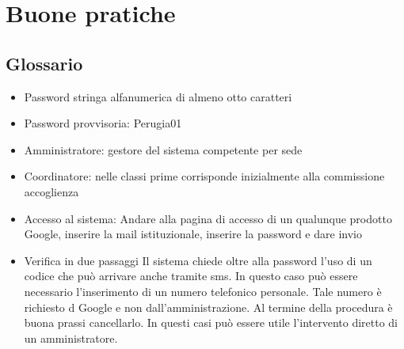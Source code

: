 \chapter{Buone pratiche}
\section{Glossario}
\begin{itemize}
	\item Password stringa alfanumerica di almeno otto caratteri
	\item Password provvisoria: Perugia01
	\item Amministratore: gestore del sistema competente per sede
	\item Coordinatore: nelle classi prime corrisponde inizialmente alla commissione 
	accoglienza
	\item Accesso al sistema: Andare alla pagina di accesso di un qualunque 
	prodotto Google, inserire la mail istituzionale, inserire la password e 
	dare invio
	\item Verifica in due passaggi Il sistema chiede oltre alla password l'uso 
	di un codice che può arrivare anche tramite sms. In questo caso può essere necessario
	l'inserimento di un numero telefonico personale. Tale numero è richiesto d Google e 
	non dall'amministrazione. Al termine della procedura è buona prassi 
	cancellarlo. In questi casi può essere utile l'intervento diretto di un 
	amministratore.
\end{itemize}
